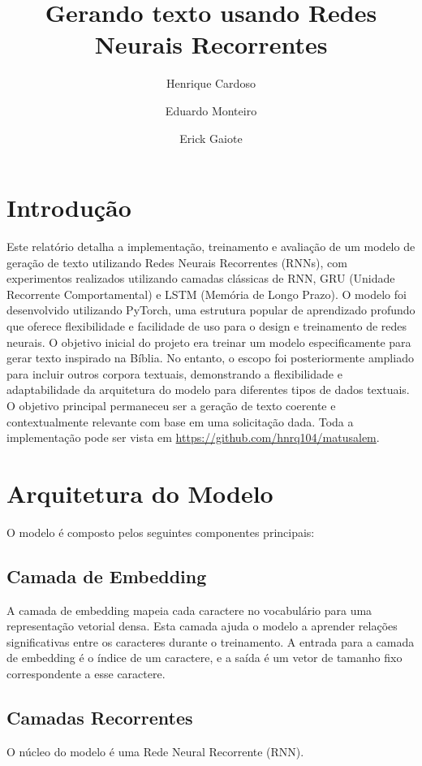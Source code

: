 \documentclass[a4paper,12pt]{article}
\title{Gerando texto usando Redes Neurais Recorrentes}
\author{
    Henrique Cardoso\\
    \and 
    Eduardo Monteiro\\
    \and 
    Erick Gaiote\\
    }
\date{}
\begin{document}
\maketitle

\tableofcontents
\newpage

\section{Introdução}
Este relatório detalha a implementação, treinamento e avaliação de um modelo de geração de texto utilizando Redes Neurais Recorrentes (RNNs), com experimentos realizados utilizando camadas clássicas de RNN, GRU (Unidade Recorrente Comportamental) e LSTM (Memória de Longo Prazo). O modelo foi desenvolvido utilizando PyTorch, uma estrutura popular de aprendizado profundo que oferece flexibilidade e facilidade de uso para o design e treinamento de redes neurais. O objetivo inicial do projeto era treinar um modelo especificamente para gerar texto inspirado na Bíblia. No entanto, o escopo foi posteriormente ampliado para incluir outros corpora textuais, demonstrando a flexibilidade e adaptabilidade da arquitetura do modelo para diferentes tipos de dados textuais. O objetivo principal permaneceu ser a geração de texto coerente e contextualmente relevante com base em uma solicitação dada.
Toda a implementação pode ser vista em \url{https://github.com/hnrq104/matusalem}.

\section{Arquitetura do Modelo} O modelo é composto pelos seguintes componentes principais:

\subsection{Camada de Embedding} A camada de embedding mapeia cada caractere no vocabulário para uma representação vetorial densa. Esta camada ajuda o modelo a aprender relações significativas entre os caracteres durante o treinamento. A entrada para a camada de embedding é o índice de um caractere, e a saída é um vetor de tamanho fixo correspondente a esse caractere.

\subsection{Camadas Recorrentes}
O núcleo do modelo é uma Rede Neural Recorrente (RNN).
\end{document}
